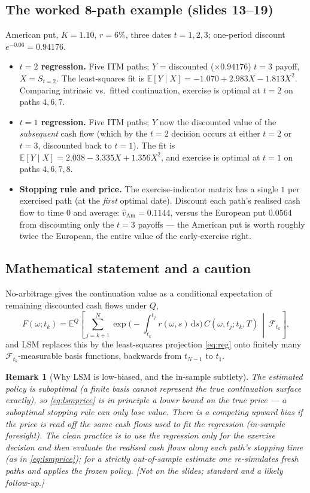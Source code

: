\documentclass[11pt]{article}
\newcommand{\E}{\mathbb{E}}
\newcommand{\dd}{\,\mathrm{d}}
\newtheorem{remark}{Remark}
\begin{document}
\subsection{The worked 8-path example (slides 13--19)}
American put, $K=1.10$, $r=6\%$, three dates $t=1,2,3$; one-period discount $e^{-0.06}=0.94176$.
\begin{itemize}[leftmargin=*]
  \item \textbf{$t=2$ regression.} Five ITM paths; $Y$ = discounted ($\times0.94176$) $t=3$ payoff, $X=S_{t=2}$.
  The least-squares fit is $\E[Y\mid X]=-1.070+2.983X-1.813X^2$. Comparing intrinsic vs.\ fitted continuation,
  exercise is optimal at $t=2$ on paths $4,6,7$.
  \item \textbf{$t=1$ regression.} Five ITM paths; $Y$ now the discounted value of the \emph{subsequent} cash
  flow (which by the $t=2$ decision occurs at either $t=2$ or $t=3$, discounted back to $t=1$). The fit is
  $\E[Y\mid X]=2.038-3.335X+1.356X^2$, and exercise is optimal at $t=1$ on paths $4,6,7,8$.
  \item \textbf{Stopping rule and price.} The exercise-indicator matrix has a single $1$ per exercised path (at
  the \emph{first} optimal date). Discount each path's realised cash flow to time $0$ and average:
  $\hat v_{\text{Am}}=0.1144$, versus the European put $0.0564$ from discounting only the $t=3$ payoffs --- the
  American put is worth roughly twice the European, the entire value of the early-exercise right.
\end{itemize}

\subsection{Mathematical statement and a caution}
No-arbitrage gives the continuation value as a conditional expectation of remaining discounted cash flows under
$Q$,
\begin{equation}
F(\omega;t_k)=\E^{Q}\!\left[\sum_{j=k+1}^{N}\exp\!\Big(-\!\int_{t_k}^{t_j}\! r(\omega,s)\dd s\Big)
\,C(\omega,t_j;t_k,T)\,\middle|\,\mathcal F_{t_k}\right],
\end{equation}
and LSM replaces this by the least-squares projection \eqref{eq:reg} onto finitely many
$\mathcal F_{t_k}$-measurable basis functions, backwards from $t_{N-1}$ to $t_1$.

\begin{remark}[Why LSM is low-biased, and the in-sample subtlety]
The estimated policy is suboptimal (a finite basis cannot represent the true continuation surface exactly), so
\eqref{eq:lsmprice} is in principle a \emph{lower} bound on the true price --- a suboptimal stopping rule can
only lose value. There is a competing \emph{upward} bias if the price is read off the \emph{same} cash flows
used to fit the regression (in-sample foresight). The clean practice is to use the regression only for the
\emph{exercise decision} and then evaluate the realised cash flows along each path's stopping time (as in
\eqref{eq:lsmprice}); for a strictly out-of-sample estimate one re-simulates fresh paths and applies the frozen
policy. \emph{[Not on the slides; standard and a likely follow-up.]}
\end{remark}
\end{document}
